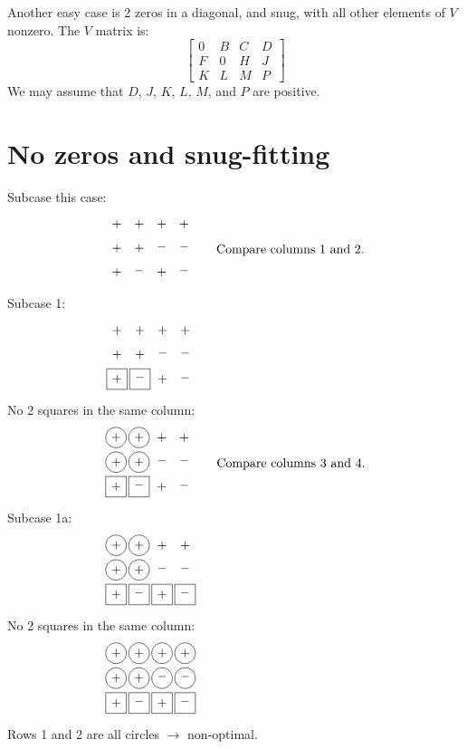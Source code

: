 Another easy case is 2 zeros in a diagonal, and snug, with all other elements
of $V$ nonzero.  The $V$ matrix is:
\begin{equation*}
\begin{bmatrix}
0 & B & C & D \\
F & 0 & H & J \\
K & L & M & P
\end{bmatrix}
\end{equation*}
We may assume that $D$, $J$, $K$, $L$, $M$, and $P$ are positive.

\section*{No zeros and snug-fitting}

Subcase this case:
\label{refpage15}
\begin{equation*}
\myarrset
\begin{array}{cccc}
\ndcp & \ndcp & \ndcp & \ndcp \\
\ndcp & \ndcp & \ndcm & \ndcm \\
\ndsp & \ndsm & \ndsp & \ndsm
\end{array}
~~~~~\text{Compare columns 1 and 2.}
\end{equation*}
Subcase 1:
\begin{equation*}
\myarrset
\begin{array}{cccc}
\ndcp & \ndcp & \ndcp & \ndcp \\
\ndcp & \ndcp & \ndcm & \ndcm \\
\dsp  & \dsm  & \ndsp & \ndsm
\end{array}
~~~~~~~~~~~~~~~~~~~~~~~~~~~~~~~~~~~~~~~~
\end{equation*}
No 2 squares in the same column:
\begin{equation*}
\myarrset
\begin{array}{cccc}
\dcp  & \dcp  & \ndcp & \ndcp \\
\dcp  & \dcp  & \ndcm & \ndcm \\
\dsp  & \dsm  & \ndsp & \ndsm
\end{array}
~~~~~\text{Compare columns 3 and 4.}
\end{equation*}
Subcase 1a:
\begin{equation*}
\myarrset
\begin{array}{cccc}
\dcp  & \dcp  & \ndcp & \ndcp \\
\dcp  & \dcp  & \ndcm & \ndcm \\
\dsp  & \dsm  & \dsp  & \dsm
\end{array}
~~~~~~~~~~~~~~~~~~~~~~~~~~~~~~~~~~~~~~~~
\end{equation*}
No 2 squares in the same column:
\begin{equation*}
\myarrset
\begin{array}{cccc}
\dcp  & \dcp  & \dcp  & \dcp  \\
\dcp  & \dcp  & \dcm  & \dcm  \\
\dsp  & \dsm  & \dsp  & \dsm
\end{array}
~~~~~~~~~~~~~~~~~~~~~~~~~~~~~~~~~~~~~~~~
\end{equation*}
Rows 1 and 2 are all circles $\rightarrow$ non-optimal.

